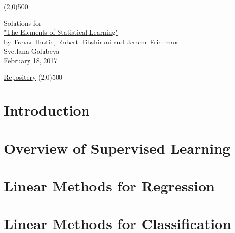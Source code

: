 \documentclass[a4paper,12pt,titlepage]{article} %
\begin{document}
\begin{titlepage}

\begin{center}
	\line(2,0){500}
\end{center}

\vspace{60pt}

\begin{center}	
	{\Large{Solutions for}}\\
	\vspace{20pt}
	\href{http://www.springer.com/gp/book/9780387848570}{\Huge{"The Elements of 
Statistical Learning"}}\\
	\vspace{20pt}
	{\LARGE{by Trevor Hastie, Robert Tibshirani and Jerome Friedman}}\\
	\vspace{20pt}
	Svetlana Golubeva\\
	\vspace{20pt}
	February 18, 2017
\end{center}

\vspace{\fill}
\begin{center}
	\href{https://github.com/attillax/ESL}{Repository}
	\line(2,0){500}
\end{center}

\end{titlepage}

\tableofcontents
\newpage
\section{Introduction}


\newpage
\section{Overview of Supervised Learning}


\newpage
\section{Linear Methods for Regression}


\newpage
\section{Linear Methods for Classification}
\end{document}
